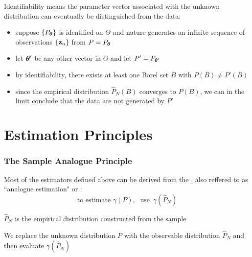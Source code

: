 \begin{frame}
    
    \vspace{2em}
    Identifiability means the parameter vector associated with
    the unknown distribution can eventually be distinguished from the data:
    
    \begin{itemize}
        \item suppose $\{P_{{\boldsymbol \theta}}\}$ is identified on $\Theta$ and
            nature generates an infinite sequence of observations $\{{\mathbf z}_n\}$ from $P = P_{{\boldsymbol \theta}}$
        \item let ${\boldsymbol \theta}'$ be any other vector in $\Theta$ and let
    $P'= P_{{\boldsymbol \theta}'}$
        \item  by identifiability, there exists at least one Borel set
    $B$ with $P(B) \not= P'(B)$
        \item since the empirical distribution $\hat P_N(B)$
        converges to $P(B)$, we can in the limit conclude that the data are not
        generated by $P'$
    \end{itemize}
    
\end{frame}

\section{Estimation Principles}

\begin{frame}\frametitle{The Sample Analogue Principle}

    \vspace{2em}
    Most of the estimators defined above can be derived from the , 
        also reffered to as ``analogue estimation" or : 
    \begin{equation*}
        \text{to estimate } \gamma(P),\;
        \text{ use } \,
        \gamma(\hat P_N)
    \end{equation*}
    
    $\hat P_N$ is the empirical distribution constructed from the sample
    
    \vspace{2em}
    We replace the unknown distribution 
    $P$ with the observable distribution $\hat P_N$ and then 
    evaluate $\gamma(\hat P_N)$
\end{frame}


